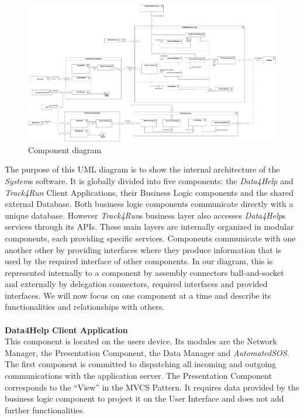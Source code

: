 \documentclass[titlepage]{article}
\begin{document}
	\begin{figure}[H]
		\flushleft
		\includegraphics[width=15cm]{ComponentDiagram.png}
		\caption{Component diagram}
		\label{fig:COMPDIA}
	\end{figure}
	\noindent
	The purpose of this UML diagram is to show the internal architecture of the {\it System}\textsc{}s software. It is globally divided into five components: the {\it Data4Help} and {\it Track4Run} Client Applications, their Business Logic components and the shared external Database. Both business logic components communicate directly with a unique database. However {\it Track4Run}\textsc{}s business layer also accesses {\it Data4Help}\textsc{}s services through its APIs. These main layers are internally organized in modular components, each providing specific services. 
	Components communicate with one another other by providing interfaces where they produce information that is used by the required interface of other components. In our diagram, this is represented internally to a component by assembly connectors ball-and-socket and externally by delegation connectors, required interfaces and provided interfaces.
	We will now focus on one component at a time and describe its functionalities and relationships with others. \\ \\
	{\bf Data4Help Client Application }\\
	This component is located on the user\textsc{}s device. Its modules are the Network Manager, the Presentation Component, the Data Manager and {\it AutomatedSOS}. 
	The first component is committed to dispatching all incoming and outgoing communications with the application server. 
	The Presentation Component corresponds to the “View” in the MVCS Pattern. It requires data provided by the business logic component to project it on the User Interface and does not add further functionalities. 
\end{document}

